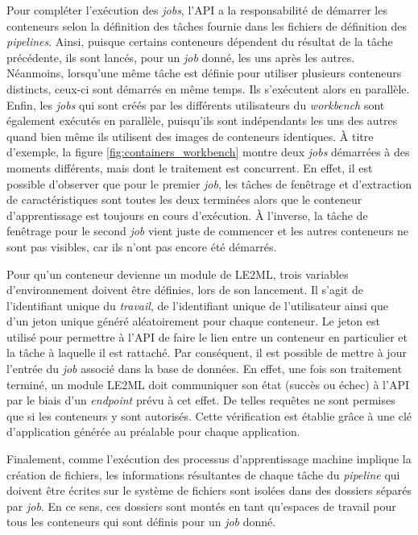 Pour compléter l'exécution des \emph{jobs}, l'\acs{API} a la responsabilité de démarrer les conteneurs selon la définition des tâches fournie dans les fichiers de définition des \textit{pipelines}. Ainsi, puisque certains conteneurs dépendent du résultat de la tâche précédente, ils sont lancés, pour un \emph{job} donné, les uns après les autres. Néanmoins, lorsqu'une même tâche est définie pour utiliser plusieurs conteneurs distincts, ceux-ci sont démarrés en même temps. Ils s'exécutent alors en parallèle. Enfin, les \emph{jobs} qui sont créés par les différents utilisateurs du \textit{workbench} sont également exécutés en parallèle, puisqu'ils sont indépendants les uns des autres quand bien même ils utilisent des images de conteneurs identiques. À titre d'exemple, la figure \ref{fig:containers_workbench} montre deux \emph{jobs} démarrées à des moments différents, mais dont le traitement est concurrent. En effet, il est possible d'observer que pour le premier \emph{job}, les tâches de fenêtrage et d'extraction de caractéristiques sont toutes les deux terminées alors que le conteneur d'apprentissage est toujours en cours d'exécution. À l'inverse, la tâche de fenêtrage pour le second \emph{job} vient juste de commencer et les autres conteneurs ne sont pas visibles, car ils n'ont pas encore été démarrés.

Pour qu'un conteneur devienne un module de \acs{LE2ML}, trois variables d'environnement doivent être définies, lors de son lancement. Il s'agit de l'identifiant unique du \emph{travail}, de l'identifiant unique de l'utilisateur ainsi que d'un jeton unique généré aléatoirement pour chaque conteneur. Le jeton est utilisé pour permettre à l'\acs{API} de faire le lien entre un conteneur en particulier et la tâche à laquelle il est rattaché. Par conséquent, il est possible de mettre à jour l'entrée du \emph{job} associé dans la base de données. En effet, une fois son traitement terminé, un module LE2ML doit communiquer son état (succès ou échec) à l'\acs{API} par le biais d'un \textit{endpoint} prévu à cet effet. De telles requêtes ne sont permises que si les conteneurs y sont autorisés. Cette vérification est établie grâce à une clé d'application générée au préalable pour chaque application.

Finalement, comme l'exécution des processus d'apprentissage machine implique la création de fichiers, les informations résultantes de chaque tâche du \textit{pipeline} qui doivent être écrites sur le système de fichiers sont isolées dans des dossiers séparés par \emph{job}. En ce sens, ces dossiers sont montés en tant qu'espaces de travail pour tous les conteneurs qui sont définis pour un \emph{job} donné.


